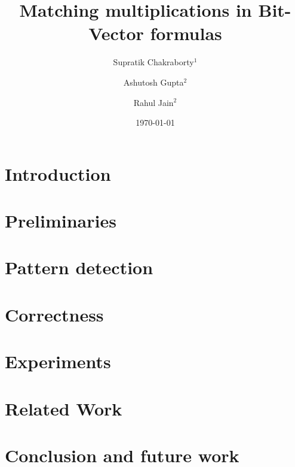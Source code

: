 \documentclass[draft]{llncs}
\begin{document}
\title{Matching multiplications in Bit-Vector formulas}

\author{Supratik Chakraborty$^1$ \and Ashutosh Gupta$^2$ \and Rahul Jain$^2$}


\date{\today}

\maketitle
\begin{abstract}

\end{abstract}

\section{Introduction}
\label{sec:intro}


\section{Preliminaries}
\label{sec:prelim}


\section{Pattern detection}
\label{sec:pattern}


\section{Correctness}
\label{sec:correct}


\section{Experiments}
\label{sec:experiments}



 \section{Related Work}
 \label{sec:related}
 

\section{Conclusion and future work}
\label{sec:conclusion}




\end{document}
